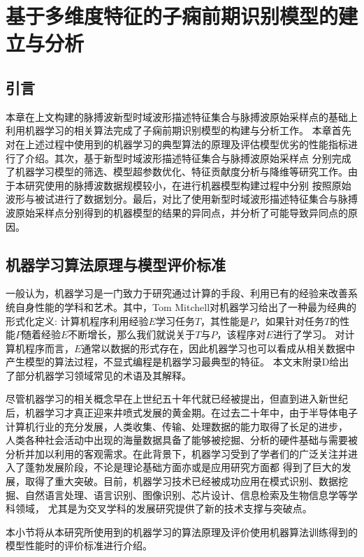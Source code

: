\chapter{基于多维度特征的子痫前期识别模型的建立与分析}
\section{引言}
本章在上文构建的脉搏波新型时域波形描述特征集合与脉搏波原始采样点的基础上利用机器学习的相关算法完成了子痫前期识别模型的构建与分析工作。
本章首先对在上述过程中使用到的机器学习的典型算法的原理及评估模型优劣的性能指标进行了介绍。其次，基于新型时域波形描述特征集合与脉搏波原始采样点
分别完成了机器学习模型的筛选、模型超参数优化、特征贡献度分析与降维等研究工作。由于本研究使用的脉搏波数据规模较小，在进行机器模型构建过程中分别
按照原始波形与被试进行了数据划分。最后，对比了使用新型时域波形描述特征集合与脉搏波原始采样点分别得到的机器模型的结果的异同点，并分析了可能导致异同点的原因。

\section{机器学习算法原理与模型评价标准}
一般认为，机器学习是一门致力于研究通过计算的手段、利用已有的经验来改善系统自身性能的学科和艺术\cite{Zhou2016,Aurélien2018}。其中，Tom Mitchell对机器学习给出了一种最为经典的形式化定义:
计算机程序利用经验$E$学习任务$T$，其性能是$P$，如果针对任务$T$的性能$P$随着经验$E$不断增长，那么我们就说关于$T$与$P$，该程序对$E$进行了学习\cite{mitchell1997,Zhou2016}。
对计算机程序而言，$E$通常以数据的形式存在，因此机器学习也可以看成从相关数据中产生模型的算法过程，不显式编程是机器学习最典型的特征。
本文末附录D给出了部分机器学习领域常见的术语及其解释。

尽管机器学习的相关概念早在上世纪五十年代就已经被提出，但直到进入新世纪后，机器学习才真正迎来井喷式发展的黄金期。在过去二十年中，由于半导体电子计算机行业的充分发展，人类收集、传输、处理数据的能力取得了长足的进步，
人类各种社会活动中出现的海量数据具备了能够被挖掘、分析的硬件基础与需要被分析并加以利用的客观需求。在此背景下，机器学习受到了学者们的广泛关注并进入了蓬勃发展阶段，不论是理论基础方面亦或是应用研究方面都
得到了巨大的发展，取得了重大突破。目前，机器学习技术已经被成功应用在模式识别、数据挖掘、自然语言处理、语言识别、图像识别、芯片设计、信息检索及生物信息学等学科领域，
尤其是为交叉学科的发展研究提供了新的技术支撑与突破点\cite{Zhou2016,Aurélien2018,Li2017}。   

本小节将从本研究所使用到的机器学习的算法原理及评价使用机器算法训练得到的模型性能时的评价标准进行介绍。
